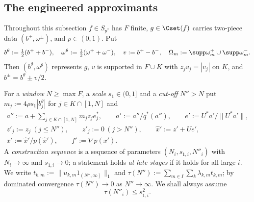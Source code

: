 
\subsection{The engineered approximants}
Throughout this subsection $f\in S_{p^*}$ has $F$ finite, $g\in\Cset(f)$
carries two-piece data $(b^\pm,\omega^\pm)$, and $\rho\in(0,1)$.  Put
\[
 b^\theta:=\tfrac12(b^++b^-),\quad \omega^\theta:=\tfrac12(\omega^++\omega^-),
 \quad v:=b^+-b^-,\quad \Omega_m:=\supp\omega^+_m\cup\supp\omega^-_m .
\]
Then $(b^\theta,\omega^\theta)$ represents $g$, $v$ is supported in $F\cup
K$ with $z_jv_j=|v_j|$ on $K$, and $b^\pm=b^\theta\pm v/2$.

\begin{definition}\label{def:engineered}
For a \emph{window} $N\ge\max F$, a \emph{scale} $s_1\in(0,1]$ and a
\emph{cut-off} $N''>N$ put $m_j:=4\rho s_1|b^\theta_j|$ for $j\in
K\cap[1,N]$ and
\begin{gather*}
 a'':=a+\sum_{j\in K\cap[1,N]}m_jz_je_j^*,\qquad a':=a''/q^*(a''),\qquad
 e':=U^*a'/\|U^*a'\|,\\
 z'_j:=z_j\ (j\le N''),\qquad z'_j:=0\ (j>N''),\qquad \hat x':=z'+Ue',\\
 x':=\hat x'/p(\hat x'),\qquad f':=\nabla p(x').
\end{gather*}
A \emph{construction sequence} is a sequence of parameters
$(N_i,s_{1,i},N''_i)$ with $N_i\to\infty$ and $s_{1,i}\to0$; a statement
holds \emph{at late stages} if it holds for all large $i$.  We write
$t_{k,m}:=\|u_{k,m}1_{(N'',\infty)}\|_1$ and
$\tau(N''):=\sum_{m\in I}\sum_k\lambda_{k,m}t_{k,m}$; by dominated convergence
$\tau(N'')\to0$ as $N''\to\infty$.  We shall always assume
\begin{equation}\label{eq:N1}
 \tau(N''_i)\le s_{1,i}^2 .
\end{equation}
\end{definition}


